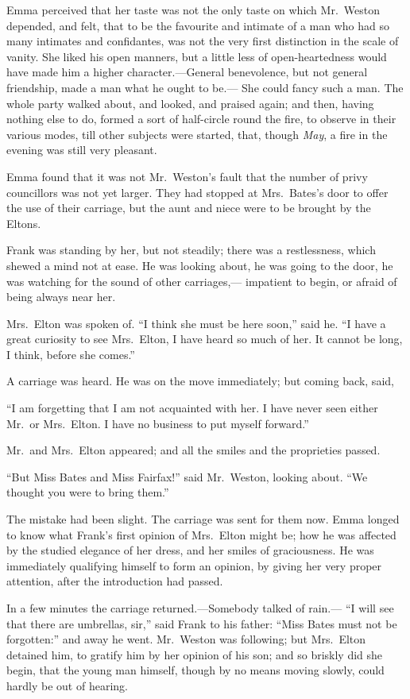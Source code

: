 Emma perceived that her taste was not the only taste on which
Mr.\ Weston depended, and felt, that to be the favourite and
intimate of a man who had so many intimates and confidantes,
was not the very first distinction in the scale of vanity.
She liked his open manners, but a little less of open-heartedness
would have made him a higher character.---General benevolence,
but not general friendship, made a man what he ought to be.---%
She could fancy such a man.  The whole party walked about,
and looked, and praised again; and then, having nothing else to do,
formed a sort of half-circle round the fire, to observe in their
various modes, till other subjects were started, that, though \emph{May},
a fire in the evening was still very pleasant.

Emma found that it was not Mr.\ Weston's fault that the number
of privy councillors was not yet larger.  They had stopped
at Mrs.\ Bates's door to offer the use of their carriage,
but the aunt and niece were to be brought by the Eltons.

Frank was standing by her, but not steadily; there was a restlessness,
which shewed a mind not at ease.  He was looking about, he was going
to the door, he was watching for the sound of other carriages,---%
impatient to begin, or afraid of being always near her.

Mrs.\ Elton was spoken of.  ``I think she must be here soon,'' said he.
``I have a great curiosity to see Mrs.\ Elton, I have heard so much
of her.  It cannot be long, I think, before she comes.''

A carriage was heard.  He was on the move immediately;
but coming back, said,

``I am forgetting that I am not acquainted with her.  I have never seen
either Mr.\ or Mrs.\ Elton.  I have no business to put myself forward.''

Mr.\ and Mrs.\ Elton appeared; and all the smiles and the proprieties passed.

``But Miss Bates and Miss Fairfax!'' said Mr.\ Weston, looking about.
``We thought you were to bring them.''

The mistake had been slight.  The carriage was sent for them now.
Emma longed to know what Frank's first opinion of Mrs.\ Elton
might be; how he was affected by the studied elegance of her dress,
and her smiles of graciousness.  He was immediately qualifying
himself to form an opinion, by giving her very proper attention,
after the introduction had passed.

In a few minutes the carriage returned.---Somebody talked of rain.---%
``I will see that there are umbrellas, sir,'' said Frank to his father:
``Miss Bates must not be forgotten:''  and away he went.  Mr.\ Weston
was following; but Mrs.\ Elton detained him, to gratify him by her
opinion of his son; and so briskly did she begin, that the young
man himself, though by no means moving slowly, could hardly be out
of hearing.

